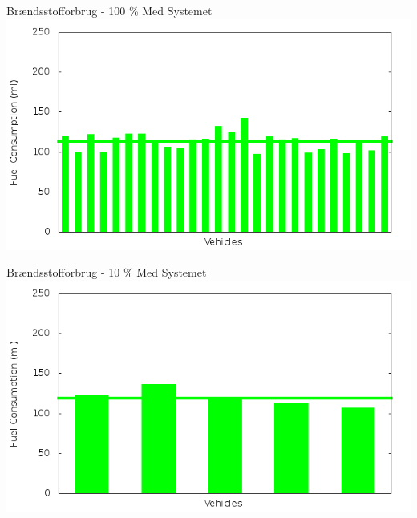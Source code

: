 \begin{frame}{Brændsstofforbrug - 100 \% Med Systemet}
\includegraphics[width=1\textwidth]{images/fuelRouteControlled100.png}
\end{frame}


\begin{frame}{Brændsstofforbrug - 10 \% Med Systemet}
\includegraphics[width=1\textwidth]{images/fuelRouteControlled10.png}
\end{frame}




